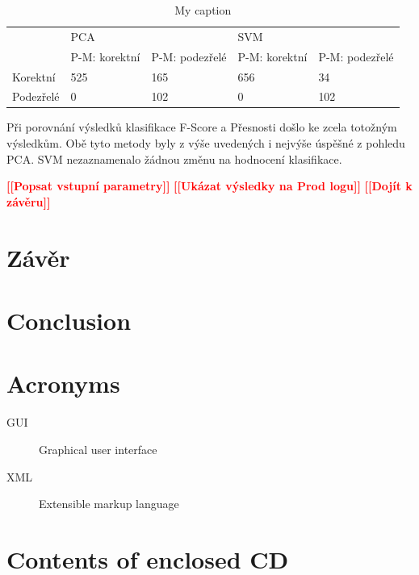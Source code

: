 \documentclass[thesis=M,czech]{FITthesis}[2012/10/20]
\newcommand{\todo}[1]{\textcolor{red}{\textbf{[[#1]]}}}
\begin{document}
			\begin{table}[htb]\centering
				\centering
				\caption{My caption}
				\label{table:anomaly_f-score}
				\begin{tabular}{|l|l|l|l|l|}
					\hline
					\multirow{2}{*}{} & \multicolumn{2}{l|}{PCA}                 & \multicolumn{2}{l|}{SVM}                 \\ 
					& P-M: korektní & P-M: podezřelé & P-M: korektní & P-M: podezřelé \\ \hline
					Korektní          & 525                & 165                 & 656                & 34                  \\ \hline
					Podezřelé         & 0                  & 102                 & 0                  & 102                 \\ \hline
				\end{tabular}
			\end{table}
		
			Při porovnání výsledků klasifikace F-Score a Přesnosti došlo ke zcela totožným výsledkům. Obě tyto metody byly z výše uvedených i nejvýše úspěšné z pohledu PCA. SVM nezaznamenalo žádnou změnu na hodnocení klasifikace.
		
			
	
		\todo{Popsat vstupní parametry}
		\todo{Ukázat výsledky na Prod logu}	
		\todo{Dojít k závěru}						
	
\chapter{Závěr}

\chapter{Conclusion}





\appendix

\chapter{Acronyms}
\begin{description}
	\item[GUI] Graphical user interface
	\item[XML] Extensible markup language
\end{description}


\chapter{Contents of enclosed CD}
\end{document}
